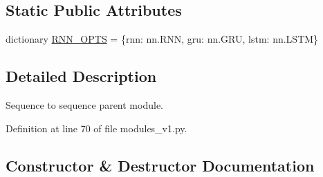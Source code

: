 \subsection*{Static Public Attributes}
\begin{DoxyCompactItemize}
\item 
dictionary \hyperlink{classparlai_1_1agents_1_1legacy__agents_1_1seq2seq_1_1modules__v1_1_1Seq2seq_ad1fc7a01d858de2b7b10f805d5891831}{R\+N\+N\+\_\+\+O\+P\+TS} = \{\textquotesingle{}rnn\textquotesingle{}\+: nn.\+R\+NN, \textquotesingle{}gru\textquotesingle{}\+: nn.\+G\+RU, \textquotesingle{}lstm\textquotesingle{}\+: nn.\+L\+S\+TM\}
\end{DoxyCompactItemize}


\subsection{Detailed Description}
\begin{DoxyVerb}Sequence to sequence parent module.
\end{DoxyVerb}
 

Definition at line 70 of file modules\+\_\+v1.\+py.



\subsection{Constructor \& Destructor Documentation}
\mbox{\label{classparlai_1_1agents_1_1legacy__agents_1_1seq2seq_1_1modules__v1_1_1Seq2seq_abfe3c5c84e59f3a9d2fb2a319e422be2}} 
